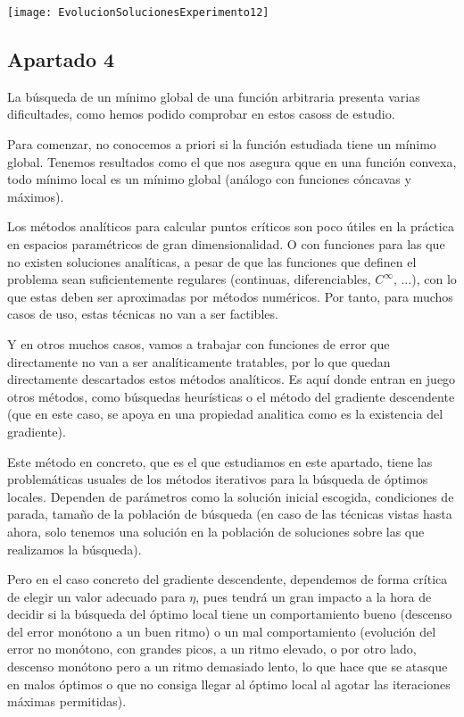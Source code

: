 \documentclass[11pt]{article}
\begin{document}
\texttt{[image: EvolucionSolucionesExperimento12]}

\subsection{Apartado 4}

La búsqueda de un mínimo global de una función arbitraria presenta varias dificultades, como hemos podido comprobar en estos casoss de estudio.

Para comenzar, no conocemos a priori si la función estudiada tiene un mínimo global. Tenemos resultados como el que nos asegura qque en una función convexa, todo mínimo local es un mínimo global (análogo con funciones cóncavas y máximos).

Los métodos analíticos para calcular puntos críticos son poco útiles en la práctica en espacios paramétricos de gran dimensionalidad. O con funciones para las que no existen soluciones analíticas, a pesar de que las funciones que definen el problema sean suficientemente regulares (continuas, diferenciables, $C^\infty$, $\ldots$), con lo que estas deben ser aproximadas por métodos numéricos. Por tanto, para muchos casos de uso, estas técnicas no van a ser factibles.

Y en otros muchos casos, vamos a trabajar con funciones de error que directamente no van a ser analíticamente tratables, por lo que quedan directamente descartados estos métodos analíticos. Es aquí donde entran en juego otros métodos, como búsquedas heurísticas o el método del gradiente descendente (que en este caso, se apoya en una propiedad analitica como es la existencia del gradiente).

Este método en concreto, que es el que estudiamos en este apartado, tiene las problemáticas usuales de los métodos iterativos para la búsqueda de óptimos locales. Dependen de parámetros como la solución inicial escogida, condiciones de parada, tamaño de la población de búsqueda (en caso de las técnicas vistas hasta ahora, solo tenemos una solución en la población de soluciones sobre las que realizamos la búsqueda).

Pero en el caso concreto del gradiente descendente, dependemos de forma crítica de elegir un valor adecuado para $\eta$, pues tendrá un gran impacto a la hora de decidir si la búsqueda del óptimo local tiene un comportamiento bueno (descenso del error monótono a un buen ritmo) o un mal comportamiento (evolución del error no monótono, con grandes picos, a un ritmo elevado, o por otro lado, descenso monótono pero a un ritmo demasiado lento, lo que hace que se atasque en malos óptimos o que no consiga llegar al óptimo local al agotar las iteraciones máximas permitidas).
\end{document}
